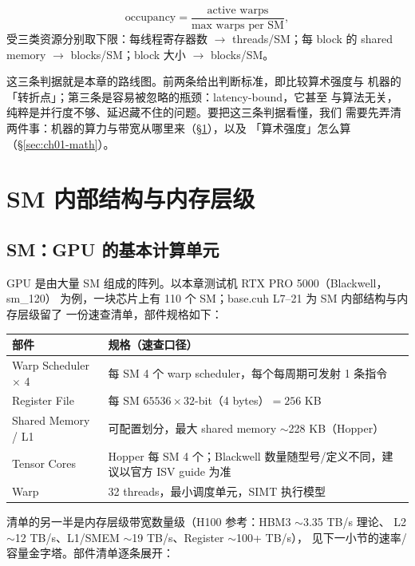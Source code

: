 \begin{equation*}
  \mathrm{occupancy} = \frac{\text{active\ warps}}{\text{max\ warps\ per\ SM}},
\end{equation*}
受三类资源分别取下限：每线程寄存器数 $\to$ threads/SM；每 block 的
shared memory $\to$ blocks/SM；block 大小 $\to$ blocks/SM。

这三条判据就是本章的路线图。前两条给出判断标准，即比较算术强度与
机器的「转折点」；第三条是容易被忽略的瓶颈：latency-bound，它甚至
与算法无关，纯粹是并行度不够、延迟藏不住的问题。要把这三条判据看懂，我们
需要先弄清两件事：机器的算力与带宽从哪里来（\S\ref{sec:ch01-sm}），以及
「算术强度」怎么算（\S\ref{sec:ch01-math}）。

\section{SM 内部结构与内存层级}\label{sec:ch01-sm}

\subsection{SM：GPU 的基本计算单元}

GPU 是由大量 SM 组成的阵列。以本章测试机 RTX PRO 5000（Blackwell，sm\_120）
为例，一块芯片上有 110 个 SM；base.cuh L7--21 为 SM 内部结构与内存层级留了
一份速查清单，部件规格如下：

\begin{center}
\begin{tabular}{lp{10.6cm}}
\toprule
部件 & 规格（速查口径） \\
\midrule
Warp Scheduler $\times$ 4 & 每 SM 4 个 warp scheduler，每个每周期可发射 1 条指令 \\
Register File & 每 SM $65536 \times 32$-bit（4 bytes）$= 256$ KB \\
Shared Memory / L1 & 可配置划分，最大 shared memory $\sim$228 KB（Hopper） \\
Tensor Cores & Hopper 每 SM 4 个；Blackwell 数量随型号/定义不同，建议以官方 ISV guide 为准 \\
Warp & 32 threads，最小调度单元，SIMT 执行模型 \\
\bottomrule
\end{tabular}
\end{center}

清单的另一半是内存层级带宽数量级（H100 参考：HBM3 $\sim$3.35 TB/s 理论、
L2 $\sim$12 TB/s、L1/SMEM $\sim$19 TB/s、Register $\sim$100+ TB/s），
见下一小节的速率/容量金字塔。部件清单逐条展开：

